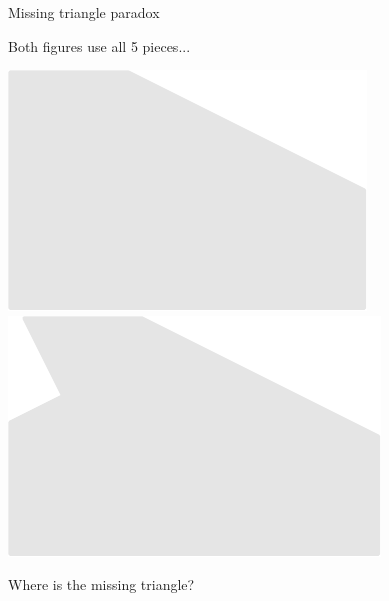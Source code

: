 \documentclass[14pt]{beamer}
\begin{document}

    \begin{frame}{Missing triangle paradox}
        \begin{center}
            Both figures use all 5 pieces...

            \vspace{36pt}

            \;\;\includegraphics[scale=0.5]{figures/figure022d.pdf}\qquad
            \qquad
            \includegraphics[scale=0.5]{figures/figure026bh.pdf}\;\;\,

            \vspace{32pt}

            Where is the missing triangle?
        \end{center}
    \end{frame}
\end{document}
